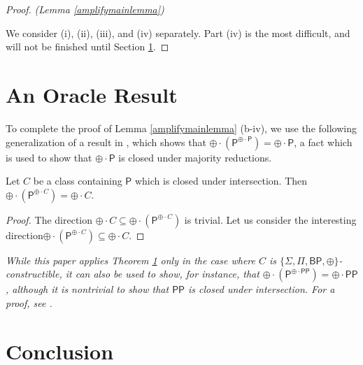 \documentclass[11pt]{article}
\newcommand{\bp}{\textsf{BP}}
\newcommand{\parity}{\oplus}
\newcommand{\p}{\textsf{P}}
\newcommand{\pp}{\textsf{PP}}
\begin{document}
\begin{proof} \emph{(Lemma \ref{amplifymainlemma})}

We consider (i), (ii), (iii), and (iv) separately. Part (iv) is the most difficult, and will not be finished until Section \ref{oracle}.
\end{proof}

\section{An Oracle Result}\label{oracle}

To complete the proof of Lemma \ref{amplifymainlemma} (b-iv), we use the following generalization of a result in \cite{Toda}, which shows that $\parity \cdot (\p ^{\parity\cdot\p}) = \parity\cdot\p$, a fact which is used to show that $\parity \cdot \p$ is closed under majority reductions.

\begin{theorem}\label{oracleparityc}
Let $C$ be a class containing \emph{$\p$} which is closed under intersection. Then\linebreak \emph{$\parity \cdot (\p^{\parity \cdot C}) = \parity \cdot C$}.
\end{theorem}
\begin{proof}
The direction $\parity \cdot C \subseteq \parity \cdot (\p^{\parity \cdot C})$ is trivial. Let us consider the interesting direction\linebreak $\parity \cdot (\p^{\parity \cdot C})\subseteq \parity\cdot C$.
\end{proof}
\begin{remark}\emph{
While this paper applies Theorem \ref{oracle} only in the case where $C$ is $\{\Sigma,\Pi,\bp,\parity\}$-constructible, it can also be used to show, for instance, that $\parity \cdot (\p^{\parity \cdot \pp}) = \parity \cdot \pp$, although it is nontrivial to show that $\pp$ is closed under intersection. For a proof, see \cite{Beigel}.
}\end{remark}

\section{Conclusion}

\pagebreak
\end{document}
